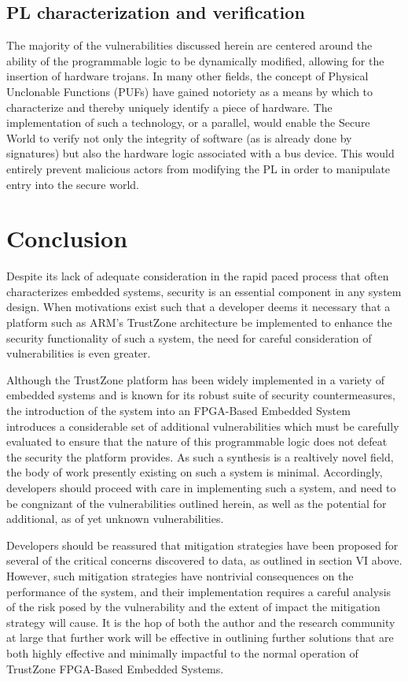 \documentclass[journal]{IEEEtran}
\begin{document}
\subsection{PL characterization and verification}
The majority of the vulnerabilities discussed herein are centered around the ability of
the programmable logic to be dynamically modified, allowing for the insertion of hardware
trojans. In many other fields, the concept of Physical Unclonable Functions (PUFs) have
gained notoriety as a means by which to characterize and thereby uniquely identify a piece
of hardware. The implementation of such a technology, or a parallel, would enable
the Secure World to verify not only the integrity of software (as is already done by
signatures) but also the hardware logic associated with a bus device. This would entirely
prevent malicious actors from modifying the PL in order to manipulate entry into the
secure world.

\section{Conclusion}
Despite its lack of adequate consideration in the rapid paced process that often 
characterizes embedded systems, security is an essential component in any system design.
When motivations exist such that a developer deems it necessary that a platform such as
ARM's TrustZone architecture be implemented to enhance the security functionality of such
a system, the need for careful consideration of vulnerabilities is even greater.

Although the TrustZone platform has been widely implemented in a variety of embedded
systems and is known for its robust suite of security countermeasures, the introduction of
the system into an FPGA-Based Embedded System introduces a considerable set of additional
vulnerabilities which must be carefully evaluated to ensure that the nature of this
programmable logic does not defeat the security the platform provides. As such a synthesis
is a realtively novel field, the body of work presently existing on such a system is
minimal. Accordingly, developers should proceed with care in implementing such a system,
and need to be congnizant of the vulnerabilities outlined herein, as well as the potential
for additional, as of yet unknown vulnerabilities.

Developers should be reassured that mitigation strategies have been proposed for several
of the critical concerns discovered to data, as outlined in section VI above. However,
such mitigation strategies have nontrivial consequences on the performance of the system,
and their implementation requires a careful analysis of the risk posed by the
vulnerability and the extent of impact the mitigation strategy will cause. It is the hop
of both the author and the research community at large that further work will be effective
in outlining further solutions that are both highly effective and minimally impactful to
the normal operation of TrustZone FPGA-Based Embedded Systems.
\end{document}
